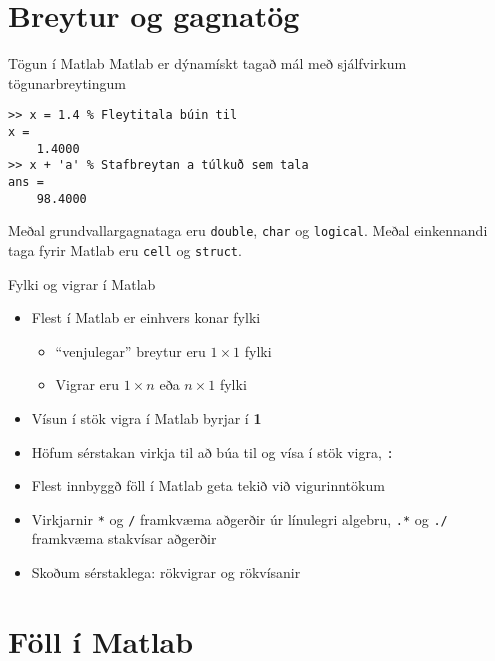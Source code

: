 \documentclass{beamer}
\begin{document}
\section{Breytur og gagnatög}

\begin{frame}[fragile]{Tögun í Matlab}
Matlab er dýnamískt tagað mál með sjálfvirkum tögunarbreytingum

\begin{verbatim}
>> x = 1.4 % Fleytitala búin til
x =
    1.4000
>> x + 'a' % Stafbreytan a túlkuð sem tala
ans =
    98.4000
\end{verbatim}

Meðal grundvallargagnataga eru \texttt{double}, \texttt{char} og \texttt{logical}. Meðal einkennandi taga fyrir Matlab eru \texttt{cell} og \texttt{struct}.

\end{frame}

\begin{frame}{Fylki og vigrar í Matlab}
    \begin{itemize}
        \item Flest í Matlab er einhvers konar fylki
        \begin{itemize}
            \item ``venjulegar'' breytur eru $1 \times 1$ fylki
            \item Vigrar eru $1 \times n$ eða $n \times 1$ fylki
        \end{itemize}
        \item Vísun í stök vigra í Matlab byrjar í \textbf{1}
        \item Höfum sérstakan virkja til að búa til og vísa í stök vigra, \texttt{:}
        \item Flest innbyggð föll í Matlab geta tekið við vigurinntökum
        \item Virkjarnir \texttt{*} og \texttt{/} framkvæma aðgerðir úr línulegri algebru, \texttt{.*} og \texttt{./} framkvæma stakvísar aðgerðir
        \item Skoðum sérstaklega: rökvigrar og rökvísanir
    \end{itemize}
\end{frame}

\section{Föll í Matlab}
\end{document}
